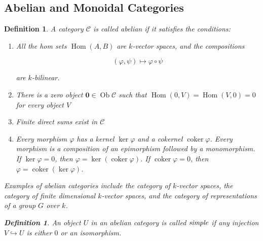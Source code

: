 \documentclass[]{article}
\newtheorem{defn}[theorem]{Definition}
\newcommand{\Hom}{\operatorname{Hom}}
\newcommand{\coker}{\operatorname{coker}}
\newcommand{\Ob}{\operatorname{Ob}}
\numberwithin{equation}{subsection}
\begin{document}
\subsection{Abelian and Monoidal Categories}


\begin{defn}
    A category $\mathcal{C}$ is called \emph{abelian} if it satisfies the conditions:

    \begin{enumerate}
    \renewcommand{\labelenumi}{\roman{enumi})}
        \item All the hom sets $\Hom(A,B)$ are $k$-vector spaces, and the compositions
            
            \begin{equation}
                (\varphi, \psi) \mapsto \varphi \circ \psi
            \end{equation}

            are $k$-bilinear.
        \item There is a zero object $\mathbf{0} \in \Ob \mathcal{C}$ such that $\Hom(0,V) = \Hom(V,0) = 0$ for every object $V$
        \item Finite direct sums exist in $\mathcal{C}$
        \item Every morphism $\varphi$ has a kernel $\ker \varphi$ and a
            cokernel $\coker \varphi$. Every morphism is a composition of an
            epimorphism followed by a monomorphism. If $\ker \varphi = 0$, then
            $\varphi = \ker(\coker \varphi)$. If $\coker \varphi = 0$, then
            $\varphi = \coker(\ker \varphi)$.
    \end{enumerate}

    Examples of abelian categories include the category of $k$-vector spaces,
    the category of finite dimensional $k$-vector spaces, and the category of
    representations of a group $G$ over $k$.

    \begin{defn}
        An object $U$ in an abelian category is called $\emph{simple}$ if any
        injection $V \hookrightarrow U$ is either $0$ or an isomorphism.
    \end{defn}
\end{defn}
\end{document}
